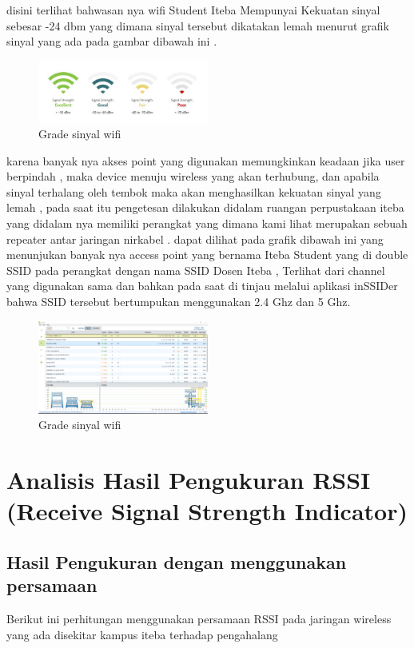 \documentclass[conference]{IEEEtran}
\begin{document}
disini terlihat bahwasan nya wifi Student Iteba Mempunyai Kekuatan sinyal sebesar -24 dbm yang dimana sinyal tersebut dikatakan lemah menurut
grafik sinyal yang ada pada gambar dibawah ini .

\begin{figure}[h]
    \centering
    \includegraphics[width=0.5\textwidth]{3.jpg}
    \caption{Grade sinyal wifi}
\end{figure}

karena banyak nya akses point yang digunakan memungkinkan keadaan jika user berpindah , maka device menuju wireless yang akan terhubung,
dan apabila sinyal terhalang oleh tembok maka akan menghasilkan kekuatan sinyal yang lemah , pada saat itu pengetesan dilakukan didalam ruangan
perpustakaan iteba yang didalam nya memiliki perangkat yang dimana kami lihat merupakan sebuah repeater antar jaringan nirkabel .
dapat dilihat pada grafik dibawah ini yang menunjukan banyak nya access point yang bernama Iteba Student yang di double SSID pada perangkat dengan nama SSID
Dosen Iteba , Terlihat dari channel yang digunakan sama dan bahkan pada saat di tinjau melalui aplikasi inSSIDer bahwa SSID tersebut bertumpukan menggunakan 2.4 Ghz dan 5 Ghz.~\cite{arnomoanalisis}

\begin{figure}[h]
    \centering
    \includegraphics[width=0.5\textwidth]{4.png}
    \caption{Grade sinyal wifi}
\end{figure}

\section{Analisis Hasil Pengukuran RSSI (Receive
Signal Strength Indicator)}
\subsection{Hasil Pengukuran dengan menggunakan persamaan}
Berikut ini perhitungan menggunakan persamaan RSSI pada jaringan wireless yang ada disekitar kampus iteba terhadap pengahalang
\end{document}
